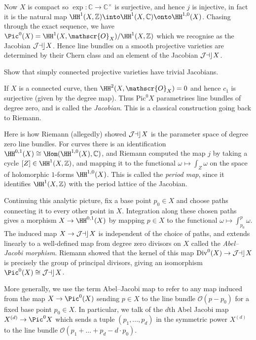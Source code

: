 Now \(X\) is compact so \(\exp:\mathbb{C}\to \mathbb{C}^\times\) is
surjective, and hence \(j\) is injective, in fact it is the natural map
\(\HH^1(X,\mathbb{Z})\into \HH^1(X,\mathbb{C})\onto \HH^{1,0}(X)\). Chasing
through the exact sequence, we have
\(\Pic^0(X)=\HH^1(X,\mathscr{O}_X)/\HH^1(X,\mathbb{Z})\) which we recognise as
the Jacobian \(\mathop{\mathcal{J\kern -0.5pt a\kern -0.5pt c\kern -1pt}} X\). Hence line bundles on a smooth projective varieties
are determined by their Chern class and an element of the Jacobian \(\mathop{\mathcal{J\kern -0.5pt a\kern -0.5pt c\kern -1pt}} X\).

\begin{exercise}
    Show that simply connected projective varieties have trivial Jacobians.
\end{exercise}

If \(X\) is a connected curve, then \(\HH^2(X,\mathscr{O}_X)=0\) and hence
\(c_1\) is surjective (given by the degree map). Thus \(\text{Pic}^0X\)
parametrises line bundles of degree zero, and is called the \textit{Jacobian}.
This is a classical construction going back to Riemann.

\begin{remark}
    Here is how Riemann (allegedly) showed \(\mathop{\mathcal{J\kern -0.5pt a\kern -0.5pt c\kern -1pt}} X\) is the parameter space of
    degree zero line bundles. For curves there is an identification
    \(\HH^{0,1}(X)\cong \Hom(\HH^{1,0}(X),\mathbb{C})\), and Riemann computed
    the map \(j\) by taking a cycle \([Z]\in \HH^1(X,\mathbb{Z})\), and mapping
    it to the functional \(\omega\mapsto \int_Z \omega\) on the space of
    holomorphic \(1\)-forms \(\HH^{1,0}(X)\). This is called the \textit{period
    map}, since it identifies \(\HH^1(X,\mathbb{Z})\) with the period lattice of
    the Jacobian.

    Continuing this analytic picture, fix a base point \(p_0\in X\) and choose
    paths connecting it to every other point in \(X\). Integration along these
    chosen paths gives a morphism \(X\to \HH^{0,1}(X)\) by mapping \(p\in X\) to
    the functional \(\omega\mapsto \int_{p_0}^p\omega\). The induced map \(X\to
    \mathop{\mathcal{J\kern -0.5pt a\kern -0.5pt c\kern -1pt}} X\) is independent of the choice of paths, and extends linearly to a
    well-defined map from degree zero divisors on \(X\) called the
    \textit{Abel--Jacobi morphism}. Riemann showed that the kernel of this map
    \(\text{Div}^0(X)\to \mathop{\mathcal{J\kern -0.5pt a\kern -0.5pt c\kern -1pt}} X\) is precisely the group of principal divisors,
    giving an isomorphism \(\Pic^0(X)\cong \Jac X\).
\end{remark}

More generally, we use the term Abel--Jacobi map to refer to any map
induced from the map \(X\to \Pic^0(X)\) sending \(p\in X\) to the line bundle
\(\mathscr{O}(p-p_0)\) for a fixed base point \(p_0\in X\). In particular, we
talk of the \(d\)th Abel Jacobi map \(X^{(d)}\to \Pic^0X\) which sends a tuple
\((p_1,...,p_d)\) in the symmetric power \(X^{(d)}\) to the line bundle
\(\mathscr{O}(p_1+...+p_d-d\cdot p_0)\).

